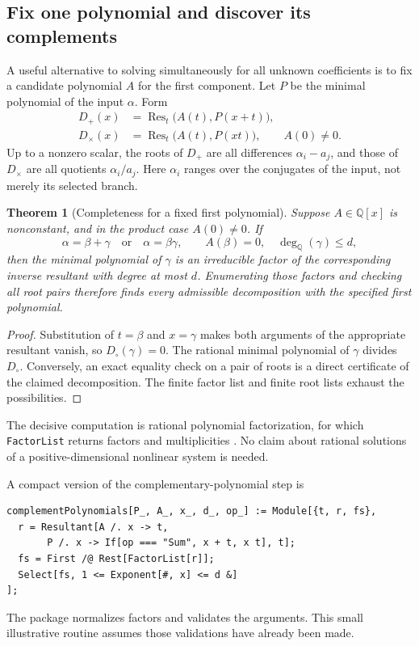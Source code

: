 \documentclass[11pt,letterpaper]{article}
\newtheorem{theorem}{Theorem}[section]
\theoremstyle{definition}
\newcommand{\Q}{\mathbb Q}
\newcommand{\Res}{\operatorname{Res}}
\newcommand{\dq}{\deg_{\Q}}
\newcommand{\code}[1]{\texttt{#1}}
\begin{document}
\subsection{Fix one polynomial and discover its complements}
A useful alternative to solving simultaneously for all unknown coefficients is to fix a candidate polynomial $A$ for the first component. Let $P$ be the minimal polynomial of the input $\alpha$. Form
\begin{align}
 D_+(x)&=\Res_t\bigl(A(t),P(x+t)\bigr),\label{eq:inverseplus}\\
 D_{\times}(x)&=\Res_t\bigl(A(t),P(xt)\bigr),\qquad A(0)\ne0.\label{eq:inversetimes}
\end{align}
Up to a nonzero scalar, the roots of $D_+$ are all differences $\alpha_i-a_j$, and those of $D_{\times}$ are all quotients $\alpha_i/a_j$. Here $\alpha_i$ ranges over the conjugates of the input, not merely its selected branch.

\begin{samepage}
\begin{theorem}[Completeness for a fixed first polynomial]\label{thm:inverse}
Suppose $A\in\Q[x]$ is nonconstant, and in the product case $A(0)\ne0$. If
\[
 \alpha=\beta+\gamma\quad\text{or}\quad\alpha=\beta\gamma,
 \qquad A(\beta)=0,\quad\dq(\gamma)\le d,
\]
then the minimal polynomial of $\gamma$ is an irreducible factor of the corresponding inverse resultant with degree at most $d$. Enumerating those factors and checking all root pairs therefore finds every admissible decomposition with the specified first polynomial.
\end{theorem}
\end{samepage}
\begin{proof}
Substitution of $t=\beta$ and $x=\gamma$ makes both arguments of the appropriate resultant vanish, so $D_{\circ}(\gamma)=0$. The rational minimal polynomial of $\gamma$ divides $D_{\circ}$. Conversely, an exact equality check on a pair of roots is a direct certificate of the claimed decomposition. The finite factor list and finite root lists exhaust the possibilities.
\end{proof}

The decisive computation is rational polynomial factorization, for which \code{FactorList} returns factors and multiplicities \cite{factorlist}. No claim about rational solutions of a positive-dimensional nonlinear system is needed.

A compact version of the complementary-polynomial step is
\begin{samepage}
\begin{lstlisting}
complementPolynomials[P_, A_, x_, d_, op_] := Module[{t, r, fs},
  r = Resultant[A /. x -> t,
       P /. x -> If[op === "Sum", x + t, x t], t];
  fs = First /@ Rest[FactorList[r]];
  Select[fs, 1 <= Exponent[#, x] <= d &]
];
\end{lstlisting}
\end{samepage}
The package normalizes factors and validates the arguments. This small illustrative routine assumes those validations have already been made.
\end{document}

